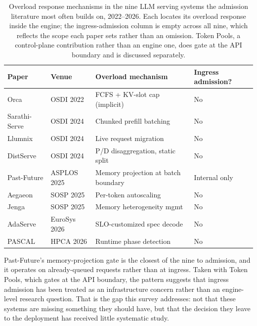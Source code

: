 \begin{table}[htbp]
\centering
\caption{Overload response mechanisms in the nine LLM serving systems the admission literature most often builds on, 2022--2026. Each locates its overload response inside the engine; the ingress-admission column is empty across all nine, which reflects the scope each paper sets rather than an omission. Token Pools, a control-plane contribution rather than an engine one, does gate at the API boundary and is discussed separately.}
\label{tab:9for9}
\small
{}
\begin{tabular}{l l l l}
\toprule
\rowcolor{admitteallight}
\textbf{Paper} & \textbf{Venue} & \textbf{Overload mechanism} & \textbf{Ingress admission?} \\
\midrule
Orca & OSDI 2022 & FCFS + KV-slot cap (implicit) & No \\
Sarathi-Serve & OSDI 2024 & Chunked prefill batching & No \\
Llumnix & OSDI 2024 & Live request migration & No \\
DistServe & OSDI 2024 & P/D disaggregation, static split & No \\
Past-Future \citep{pastfuture2025} & ASPLOS 2025 & Memory projection at batch boundary & Internal only \\
Aegaeon \citep{aegaeon2025} & SOSP 2025 & Per-token autoscaling & No \\
Jenga \citep{jenga2025} & SOSP 2025 & Memory heterogeneity mgmt & No \\
AdaServe \citep{adaserve2026} & EuroSys 2026 & SLO-customized spec decode & No \\
PASCAL \citep{pascal2026} & HPCA 2026 & Runtime phase detection & No \\
\bottomrule
\end{tabular}
\end{table}

Past-Future's memory-projection gate is the closest of the nine to
admission, and it operates on already-queued requests rather than at
ingress. Taken with Token Pools, which gates at the API boundary, the pattern suggests that ingress
admission has been treated as an infrastructure concern rather than an
engine-level research question. That is the gap this survey addresses:
not that these systems are missing something they should have, but that
the decision they leave to the deployment has received little
systematic study.

